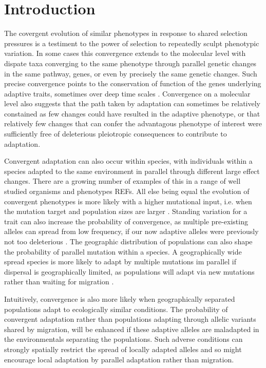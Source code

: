 \documentclass{article}
\begin{document}
\section{Introduction}

The covergent evolution of similar phenotypes in response to shared selection pressures is a testiment to the power of selection to repeatedly sculpt phenotypic variation. In some cases this convergence extends to the molecular level with dispate taxa converging to the same phenotype through parallel genetic changes in the same pathway, genes, or even by precisely the same genetic changes. Such precise convergence points to the conservation of function of the genes underlying adaptive traits, sometimes over deep time scales \citep{deephomologypapers}. Convergence on a molecular level also suggests that the path taken by adaptation can sometimes be relatively constained as few changes could have resulted in the adaptive phenotype, or that relatively few changes that can confer the advantagous phenotype of interest were sufficiently free of deleterious pleiotropic consequences to contribute to adaptation. 


Convergent adaptation can also occur within species, with individuals within a species 
adapted to the same environment in parallel through different large effect changes. 
There are a growing number of examples of this in a range of well studied organisms and phenotypes REFs.
All else being equal the evolution of convergent phenotypes is more
likely with a 
higher mutational input, i.e. when the mutation target and population sizes are larger \citep{}. 
Standing variation for a trait can also increase the probability of convergence, 
as multiple pre-existing alleles can spread from low frequency, 
if our now adaptive alleles were previously not too deleterious \citep{Orr,Hermission}. 
The geographic distribution of populations can also shape the probability of parallel mutation within a species.
A geographically wide spread species is more likely to adapt by multiple mutations im parallel if dispersal 
is geographically limited, as populations will adapt via new mutations rather than waiting for migration \citep{RalphCoop}. 


Intuitively, convergence is also more likely when geographically
separated populations adapt to ecologically similar conditions. The
probability of convergent adaptation rather than populations adapting
through allelic variants shared by migration, will be enhanced if
these adaptive alleles are maladapted in the environmentals separating
the populations. Such adverse conditions can strongly spatially restrict the spread of locally adapted alleles \citep{slatkin} 
and so might encourage local adaptation by parallel adaptation rather than migration.\\
 
\end{document}
